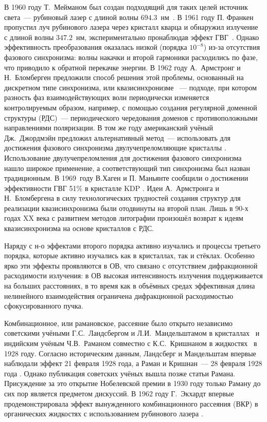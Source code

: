 В 1960 году Т.~Мейманом был создан подходящий для таких целей источник света~--- рубиновый лазер с длиной волны $694.3$~нм~\cite{maiman1960stimulated}. В 1961 году П. Франкен пропустил луч рубинового лазера через кристалл кварца и обнаружил излучение с длиной волны $347.2$~нм, экспериментально пронаблюдав эффект ГВГ~\cite{franken1961generation}. Однако эффективность преобразования оказалась низкой (порядка $10^{-8}$) из-за отсутствия фазового синхронизма: волны накачки и второй гармоники расходились по фазе, что приводило к обратной перекачке энергии. В 1962 году А.~Армстронг и Н.~Бломберген предложили способ решения этой проблемы, основанный на дискретном типе синхронизма, или квазисинхронизме \cite{armstrong1962interactions}~--- подходе, при котором разность фаз взаимодействующих волн периодически изменяется контролируемым образом, например, с помощью создания регулярной доменной структуры (РДС)~--- периодического чередования доменов с противоположными направлениями поляризации. В том же году американский учёный Дж.~Джордмэйн предложил альтернативный метод~--- использовать для достижения фазового синхронизма двулучепреломляющие кристаллы \cite{giordmaine1962mixing}. Использование двулучепреломления для достижения фазового синхронизма нашло широкое применение, а соответствующий тип синхронизма был назван традиционным. В 1969~году В.Хаген и П. Маньянте сообщили о достижении эффективности ГВГ 51\% в кристалле KDP \cite{hagen1969efficient}. Идеи А.~Армстронга и Н.~Бломбергена в силу технологических трудностей создания структур для реализации квазисинхронизма были отодвинуты на второй план. Лишь в 90-х годах XX века с развитием методов литографии произошёл возврат к идеям квазисинхронизма на основе кристаллов с РДС.


Наряду с н-о эффектами второго порядка активно изучались и процессы третьего порядка, которые активно изучались как в кристаллах, так и стёклах. Особенно ярко эти эффекты проявляются в ОВ, что связано с отсутствием дифракционной расходимости излучения: в ОВ высокая интенсивность излучения поддерживается на больших расстояниях, в то время как в объёмных средах эффективная длина нелинейного взаимодействия ограничена дифракционной расходимостью сфокусированного пучка.

Комбинационное, или рамановское, рассеяние было открыто независимо советскими учёными Г.С.~Ландсбергом и Л.И.~Мандельштамом в кристаллах~\cite{landsberg1928neue} и индийским учёным Ч.В.~Раманом совместно с К.С.~Кришнаном в жидкостях~\cite{raman1928nature} в 1928 году. Согласно историческим данным, Ландсберг и Мандельштам впервые наблюдали эффект 21 февраля 1928 года, а Раман и Кришнан~--- 28 февраля 1928 года \cite{leontovich1978}. Однако публикация советских учёных вышла позже статьи Рамана. Присуждение за это открытие Нобелевской премии в 1930 году только Раману до сих пор является предметом дискуссий. В 1962 году Г.~Экхардт впервые продемонстрировала эффект вынужденного комбинационного рассеяния (ВКР) в органических жидкостях с использованием рубинового лазера \cite{eckhardt1962stimulated}.


